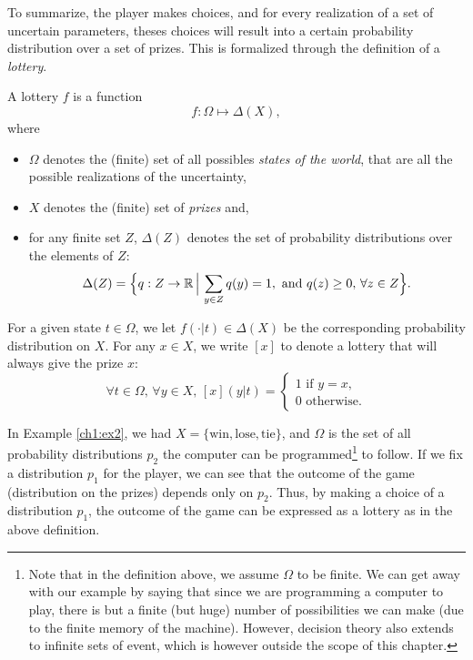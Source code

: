 To summarize, the player makes choices, and for every realization of a set of uncertain parameters, theses choices will result into a certain probability distribution over a set of prizes. This is formalized through the definition of a \emph{lottery}.

\begin{definition}
\label{ch1:def1:lottery}
A lottery $f$ is a function 
$$ f : \Omega \mapsto \Delta(X), $$
where 
\begin{itemize}
\item $\Omega$  denotes the (finite) set of all possibles \emph{states of the world}, that are all the possible realizations of the uncertainty, 
\item $X$ denotes the (finite) set of \emph{prizes} and,
\item for any finite set $Z$, $\Delta(Z)$ denotes the set of probability distributions over the elements of $Z$:
$$ \Delta(Z) = \Big \{q : Z \rightarrow \mathbb{R} \, \Big | \, \sum_{y \in Z} q(y) = 1, 
\text{ and }  q(z) \geq 0 ,\, \forall z \in Z \Big \}.$$
\end{itemize}

For a given state $t \in \Omega$, 
we let $f(\cdot| t) \in \Delta(X)$ be the corresponding probability distribution on $X$.
For any $x \in X$, we write $[x]$ to denote a lottery that will always give the prize $x$:
$$ \forall t \in \Omega, \, \forall y \in X, \, [x](y|t) = 
\begin{cases}
1 \text{ if } y = x,\\
0 \text{ otherwise.}
\end{cases} $$
\end{definition}

In Example \ref{ch1:ex2}, we had $X = \{\text{win}, \text{lose}, \text{tie} \}$, 
and $\Omega$ is the set of all probability distributions $p_2$ the computer can be programmed\footnote{Note that in the definition above, we assume $\Omega$ to be finite. We can get away with our example by saying that since we are programming a computer to play, there is but a finite (but huge) number of possibilities we can make (due to the finite memory of the machine). However, decision theory also extends to infinite sets of event, which is however outside the scope of this chapter.} to follow.  If we fix a distribution $p_1$ for the player, we can see that the outcome of the game (distribution on the prizes) depends only on $p_2$. Thus, by making a choice of a distribution $p_1$, the outcome of the game can be expressed as a lottery as in the above definition.

